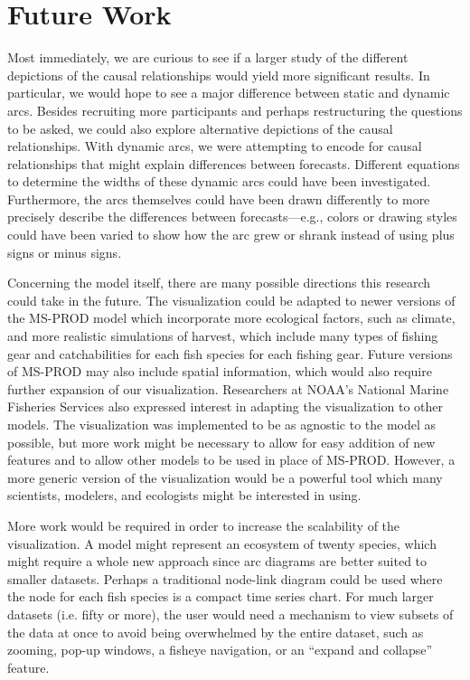 \section{Future Work}

Most immediately, we are curious to see if a larger study of the different depictions of the causal relationships would yield more significant results.  In particular, we would hope to see a major difference between static and dynamic arcs.  Besides recruiting more participants and perhaps restructuring the questions to be asked, we could also explore alternative depictions of the causal relationships.  With dynamic arcs, we were attempting to encode for causal relationships that might explain differences between forecasts.  Different equations to determine the widths of these dynamic arcs could have been investigated.  Furthermore, the arcs themselves could have been drawn differently to more precisely describe the differences between forecasts---e.g., colors or drawing styles could have been varied to show how the arc grew or shrank instead of using plus signs or minus signs.

Concerning the model itself, there are many possible directions this research could take in the future.  The visualization could be adapted to newer versions of the MS-PROD model which incorporate more ecological factors, such as climate, and more realistic simulations of harvest, which include many types of fishing gear and catchabilities for each fish species for each fishing gear.  Future versions of MS-PROD may also include spatial information, which would also require further expansion of our visualization.  Researchers at NOAA's National Marine Fisheries Services also expressed interest in adapting the visualization to other models.  The visualization was implemented to be as agnostic to the model as possible, but more work might be necessary to allow for easy addition of new features and to allow other models to be used in place of MS-PROD.  However, a more generic version of the visualization would be a powerful tool which many scientists, modelers, and ecologists might be interested in using.

More work would be required in order to increase the scalability of the visualization.  A model might represent an ecosystem of twenty species, which might require a whole new approach since arc diagrams are better suited to smaller datasets.  Perhaps a traditional node-link diagram could be used where the node for each fish species is a compact time series chart.  For much larger datasets (i.e. fifty or more), the user would need a mechanism to view subsets of the data at once to avoid being overwhelmed by the entire dataset, such as zooming, pop-up windows, a fisheye navigation, or an ``expand and collapse'' feature.

